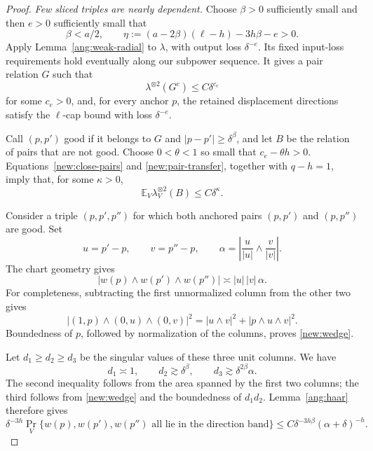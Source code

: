 \begin{proof}
\emph{Few sliced triples are nearly dependent.}
Choose \(\beta>0\) sufficiently small and then \(e>0\) sufficiently small that
\[
\beta<a/2,
\qquad
\eta:=(a-2\beta)(\ell-h)-3h\beta-e>0.
\]
Apply Lemma~\ref{ang:weak-radial} to \(\lambda\), with output loss \(\delta^{-e}\). Its fixed input-loss requirements hold eventually along our subpower sequence. It gives a pair relation \(G\) such that
\[
\lambda^{\otimes2}(G^c)\le C\delta^{c_e}
\]
for some \(c_e>0\), and, for every anchor \(p\), the retained displacement directions satisfy the \(\ell\)-cap bound with loss \(\delta^{-e}\).

Call \((p,p')\) good if it belongs to \(G\) and
\(|p-p'|\ge\delta^\beta\), and let \(B\) be the relation of pairs that are not good. Choose \(0<\theta<1\) so small that \(c_e-\theta h>0\). Equations~\eqref{new:close-pairs} and \eqref{new:pair-transfer}, together with \(q-h=1\), imply that, for some \(\kappa>0\),
\begin{equation}\label{new:bad-pairs}
\mathbb E_V\lambda_V^{\otimes2}(B)\le C\delta^\kappa.
\end{equation}

Consider a triple \((p,p',p'')\) for which both anchored pairs
\((p,p')\) and \((p,p'')\) are good. Set
\[
u=p'-p,\qquad v=p''-p,\qquad
\alpha=\left|\frac{u}{|u|}\wedge\frac{v}{|v|}\right|.
\]
The chart geometry gives
\begin{equation}\label{new:wedge}
|w(p)\wedge w(p')\wedge w(p'')|
\asymp |u|\,|v|\,\alpha.
\end{equation}
For completeness, subtracting the first unnormalized column from the other two gives
\[
|(1,p)\wedge(0,u)\wedge(0,v)|^2
=|u\wedge v|^2+|p\wedge u\wedge v|^2.
\]
Boundedness of \(p\), followed by normalization of the columns, proves \eqref{new:wedge}.

Let \(d_1\ge d_2\ge d_3\) be the singular values of these three unit columns. We have
\[
d_1\asymp1,\qquad d_2\gtrsim\delta^\beta,
\qquad d_3\gtrsim\delta^{2\beta}\alpha.
\]
The second inequality follows from the area spanned by the first two columns; the third follows from \eqref{new:wedge} and the boundedness of \(d_1d_2\). Lemma~\ref{ang:haar} therefore gives
\begin{equation}\label{new:triple-kernel}
\delta^{-3h}
\Pr_V\{w(p),w(p'),w(p'')\text{ all lie in the direction band}\}
\le C\delta^{-3h\beta}(\alpha+\delta)^{-h}.
\end{equation}


\end{proof}
